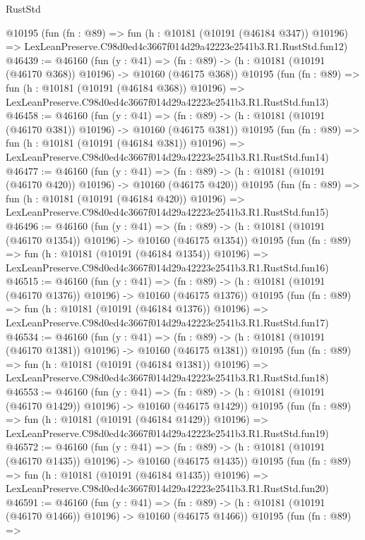 \begin{lexlean}{RustStd}
\begin{coremodule}
    @10195
    (fun (fn : @89) =>
    fun (h : @10181 (@10191 (@46184 @347)) @10196) =>
    LexLeanPreserve.C98d0ed4c3667f014d29a42223e2541b3.R1.RustStd.fun12)
@46439 := @46160
    (fun (y : @41) =>
    (fn : @89) -> (h : @10181 (@10191 (@46170 @368)) @10196) -> @10160 (@46175 @368))
    @10195
    (fun (fn : @89) =>
    fun (h : @10181 (@10191 (@46184 @368)) @10196) =>
    LexLeanPreserve.C98d0ed4c3667f014d29a42223e2541b3.R1.RustStd.fun13)
@46458 := @46160
    (fun (y : @41) =>
    (fn : @89) -> (h : @10181 (@10191 (@46170 @381)) @10196) -> @10160 (@46175 @381))
    @10195
    (fun (fn : @89) =>
    fun (h : @10181 (@10191 (@46184 @381)) @10196) =>
    LexLeanPreserve.C98d0ed4c3667f014d29a42223e2541b3.R1.RustStd.fun14)
@46477 := @46160
    (fun (y : @41) =>
    (fn : @89) -> (h : @10181 (@10191 (@46170 @420)) @10196) -> @10160 (@46175 @420))
    @10195
    (fun (fn : @89) =>
    fun (h : @10181 (@10191 (@46184 @420)) @10196) =>
    LexLeanPreserve.C98d0ed4c3667f014d29a42223e2541b3.R1.RustStd.fun15)
@46496 := @46160
    (fun (y : @41) =>
    (fn : @89) -> (h : @10181 (@10191 (@46170 @1354)) @10196) -> @10160 (@46175 @1354))
    @10195
    (fun (fn : @89) =>
    fun (h : @10181 (@10191 (@46184 @1354)) @10196) =>
    LexLeanPreserve.C98d0ed4c3667f014d29a42223e2541b3.R1.RustStd.fun16)
@46515 := @46160
    (fun (y : @41) =>
    (fn : @89) -> (h : @10181 (@10191 (@46170 @1376)) @10196) -> @10160 (@46175 @1376))
    @10195
    (fun (fn : @89) =>
    fun (h : @10181 (@10191 (@46184 @1376)) @10196) =>
    LexLeanPreserve.C98d0ed4c3667f014d29a42223e2541b3.R1.RustStd.fun17)
@46534 := @46160
    (fun (y : @41) =>
    (fn : @89) -> (h : @10181 (@10191 (@46170 @1381)) @10196) -> @10160 (@46175 @1381))
    @10195
    (fun (fn : @89) =>
    fun (h : @10181 (@10191 (@46184 @1381)) @10196) =>
    LexLeanPreserve.C98d0ed4c3667f014d29a42223e2541b3.R1.RustStd.fun18)
@46553 := @46160
    (fun (y : @41) =>
    (fn : @89) -> (h : @10181 (@10191 (@46170 @1429)) @10196) -> @10160 (@46175 @1429))
    @10195
    (fun (fn : @89) =>
    fun (h : @10181 (@10191 (@46184 @1429)) @10196) =>
    LexLeanPreserve.C98d0ed4c3667f014d29a42223e2541b3.R1.RustStd.fun19)
@46572 := @46160
    (fun (y : @41) =>
    (fn : @89) -> (h : @10181 (@10191 (@46170 @1435)) @10196) -> @10160 (@46175 @1435))
    @10195
    (fun (fn : @89) =>
    fun (h : @10181 (@10191 (@46184 @1435)) @10196) =>
    LexLeanPreserve.C98d0ed4c3667f014d29a42223e2541b3.R1.RustStd.fun20)
@46591 := @46160
    (fun (y : @41) =>
    (fn : @89) -> (h : @10181 (@10191 (@46170 @1466)) @10196) -> @10160 (@46175 @1466))
    @10195
    (fun (fn : @89) =>

\end{coremodule}
\end{lexlean}
